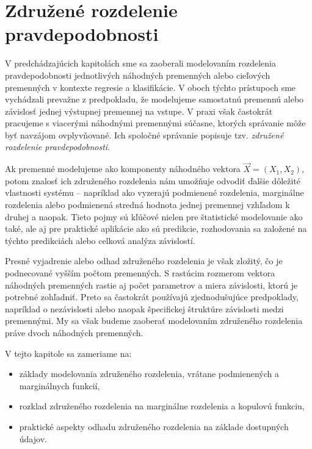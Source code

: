 \chapter{Združené rozdelenie pravdepodobnosti}\label{sec:joint_dist}

V predchádzajúcich kapitolách sme sa zaoberali modelovaním rozdelenia pravdepodobnosti jednotlivých náhodných premenných alebo cieľových premenných v kontexte regresie a klasifikácie. V oboch týchto prístupoch sme vychádzali prevažne z predpokladu, že modelujeme samostatnú premennú alebo závislosť jednej výstupnej premennej na vstupe. V praxi však častokrát pracujeme s viacerými náhodnými premennými súčasne, ktorých správanie môže byť navzájom ovplyvňované. Ich spoločné správanie popisuje tzv. \textit{združené rozdelenie pravdepodobnosti}.

Ak premenné modelujeme ako komponenty náhodného vektora $\vec{X} = (X_1, X_2)$, potom znalosť ich združeného rozdelenia nám umožňuje odvodiť ďalšie dôležité vlastnosti systému – napríklad ako vyzerajú podmienené rozdelenia, marginálne rozdelenia alebo podmienená stredná hodnota jednej premennej vzhľadom k druhej a naopak. Tieto pojmy sú kľúčové nielen pre štatistické modelovanie ako také, ale aj pre praktické aplikácie ako sú predikcie, rozhodovania sa založené na týchto predikciách alebo celková analýza závislostí.

Presné vyjadrenie alebo odhad združeného rozdelenia je však zložitý, čo je podnecované vyšším počtom premenných. S rastúcim rozmerom vektora náhodných premenných rastie aj počet parametrov a miera závislosti, ktorú je potrebné zohľadniť. Preto sa častokrát používajú zjednodušujúce predpoklady, napríklad o nezávislosti alebo naopak špecifickej štruktúre závislosti medzi premennými. My sa však budeme zaoberať modelovaním združeného rozdelenia práve dvoch náhodných premenných.

V tejto kapitole sa zameriame na:
\begin{itemize}
  \item základy modelovania združeného rozdelenia, vrátane podmienených a marginálnych funkcií,
  \item rozklad združeného rozdelenia na marginálne rozdelenia a kopulovú funkciu,
  \item praktické aspekty odhadu združeného rozdelenia na základe dostupných údajov.
\end{itemize}

